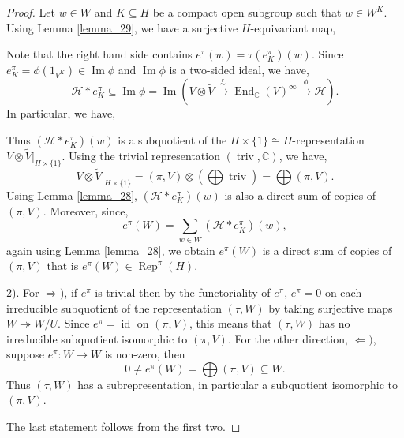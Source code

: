 \documentclass[8pt]{article}
\DeclareMathOperator{\triv}{triv}
\DeclareMathOperator{\Rep}{Rep}
\DeclareMathOperator{\End}{End}
\DeclareMathOperator{\Image}{Im}
\DeclareMathOperator{\id}{id}
\newcommand{\C}[0]{\mathbb{C}}
\newcommand{\hecke}[0]{\mathscr{H}}
\begin{document}
\begin{proof}
  Let $w\in W$ and $K\subseteq H$ be a compact open subgroup such that $w\in W^K$. Using Lemma \ref{lemma_29}, we have a surjective $H$-equivariant map,
  \begin{center}
  \end{center}
  Note that the right hand side contains $e^\pi(w) = \tau(e_K^\pi)(w)$.
  Since $e_K^\pi=\phi(1_{V^K})\in\Image\phi$ and $\Image\phi$ is a two-sided ideal, we have,
  \begin{equation*}
    \hecke\ast e_K^\pi\subseteq\Image\phi = \Image(V\otimes \widetilde{V}\stackrel{\stackrel{r}{\sim}}{\to}\End_\C(V)^\infty\stackrel{\phi}{\to}\hecke).
  \end{equation*}
  In particular, we have,
  \begin{center}
  \end{center}
  Thus $(\hecke\ast e_K^\pi)(w)$ is a subquotient of the $H\times\{1\}\cong H$-representation $V\otimes \widetilde{V}|_{H\times\{1\}}$.
  Using the trivial representation $(\triv,\C)$, we have,
  \begin{equation*}
    V\otimes\widetilde{V}|_{H\times\{1\}} = (\pi,V)\otimes\left(\bigoplus\triv\right) = \bigoplus(\pi,V).
  \end{equation*}
  Using Lemma \ref{lemma_28}, $(\hecke\ast e_K^\pi)(w)$ is also a direct sum of copies of $(\pi,V)$. Moreover, since,
  \begin{equation*}
    e^\pi(W) = \sum_{w\in W}(\hecke\ast e_K^\pi)(w),
  \end{equation*}
  again using Lemma \ref{lemma_28}, we obtain $e^\pi(W)$ is a direct sum of copies of $(\pi,V)$ that is $e^\pi(W)\in\Rep^\pi(H)$.
  \par 2). For $\Rightarrow)$, if $e^\pi$ is trivial then by the functoriality of $e^\pi$, $e^\pi=0$ on each irreducible subquotient of the representation $(\tau,W)$ by taking surjective maps $W\twoheadrightarrow W/U$. 
  Since $e^\pi=\id$ on $(\pi,V)$, this means that $(\tau,W)$ has no irreducible subquotient isomorphic to $(\pi,V)$. For the other direction, $\Leftarrow)$, suppose $e^\pi:W\to W$
  is non-zero, then 
  \begin{equation*}
    0\not= e^\pi(W)=\bigoplus(\pi,V)\subseteq W.
  \end{equation*} 
  Thus $(\tau,W)$ has a subrepresentation, in particular a subquotient isomorphic to $(\pi,V)$.
  \par The last statement follows from the first two.
\end{proof}
\end{document}
